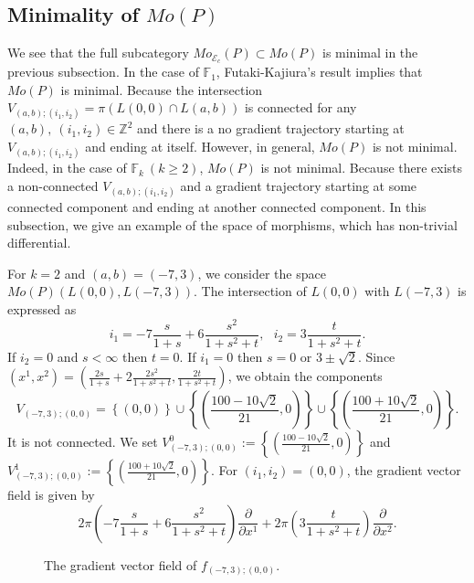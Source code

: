 \documentclass[12pt,reqno]{amsart}
\newcommand{\Z}{{\mathbb{Z}}}
\newcommand{\F}{{\mathbb{F}}}
\newcommand{\Fk}{{\F_k}}
\newcommand{\cE}{{\mathcal{E}}}
\newcommand{\del}{{\partial}}
\theoremstyle{definition}
\begin{document}
\subsection{Minimality of $Mo(P)$}\label{minimality}
We see that the full subcategory $Mo_{\cE_c}(P)\subset Mo(P)$ is minimal in the previous subsection. In the case of $\F_1$, Futaki-Kajiura's result implies that $Mo(P)$ is minimal. Because the intersection $V_{(a,b);(i_1,i_2)}=\pi(L(0,0)\cap L(a,b))$ is connected for any $(a,b),\ (i_1,i_2)\in\Z^2$ and there is a no gradient trajectory starting at $V_{(a,b);(i_1,i_2)}$ and ending at itself. However, in general, $Mo(P)$ is not minimal.
Indeed, in the case of $\Fk\ (k\geq2)$, $Mo(P)$ is not minimal. Because there exists a non-connected $V_{(a,b);(i_1,i_2)}$ and a gradient trajectory starting at some connected component and ending at another connected component.
 In this subsection, we give an example of the space of morphisms, which has non-trivial differential.\par
For $k=2$ and $(a,b)=(-7,3)$, we consider the space $Mo(P)(L(0,0),L(-7,3))$. The intersection of $L(0,0)$ with $L(-7,3)$ is expressed as
\begin{equation*}
i_1 = -7\frac{s}{1+s} + 6\frac{s^2}{1+s^2+t},\ \ \ 
i_2 = 3\frac{t}{1+s^2+t}.
\end{equation*}
If $i_2=0$ and $s<\infty$ then $t=0$. If $i_1=0$ then $s=0$ or $3\pm\sqrt{2}$. Since $(x^1,x^2)=(\frac{2s}{1+s}+2\frac{2s^2}{1+s^2+t},\frac{2t}{1+s^2+t})$, we obtain the components
\begin{equation*}
V_{(-7,3);(0,0)}  = \left\{\left(0,0\right)\right\}\cup\left\{\left(\frac{100-10\sqrt{2}}{21},0\right)\right\}\cup\left\{\left(\frac{100+10\sqrt{2}}{21},0\right)\right\}.
\end{equation*}
It is not connected. We set $V_{(-7,3);(0,0)}^0:=\left\{\left(\frac{100-10\sqrt{2}}{21},0\right)\right\}$ and $V_{(-7,3);(0,0)}^1:=\left\{\left(\frac{100+10\sqrt{2}}{21},0\right)\right\}$. For $(i_1,i_2)=(0,0)$, the gradient vector field is given by
\begin{equation*}
2\pi\left(-7\frac{s}{1+s} + 6\frac{s^2}{1+s^2+t}\right)\frac{\del}{\del x^1} + 2\pi\left(3\frac{t}{1+s^2+t} \right)\frac{\del}{\del x^2}.
\end{equation*}

\begin{figure}[h]
\center
{}
\caption{The gradient vector field of $f_{(-7,3);(0,0)}$.}
\label{poly2}
\end{figure}
\end{document}
